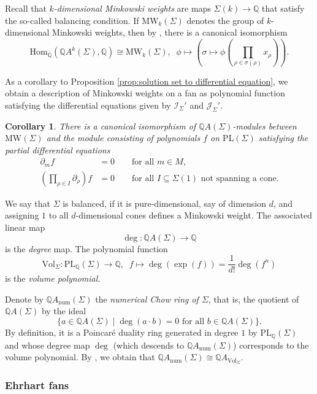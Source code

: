 \documentclass[oneside]{amsart}
\theoremstyle{plain}
\newtheorem{corollary}[theorem]{Corollary}
\theoremstyle{definition}
\newcommand{\Q}{{\mathbb{Q}}}
\newcommand{\Hom}{{\mathrm{Hom}}}
\newcommand{\Vol}{{\mathrm{Vol}}}
\newcommand{\PL}{{\mathrm{PL}}}
\newcommand{\mc}[1]{{\mathcal{#1}}}
\newcommand{\num}{{\mathrm{num}}}
\newcommand{\MW}{{\mathrm{MW}}}
\begin{document}
Recall that \emph{$k$-dimensional Minkowski weights} are maps $\Sigma(k)\to \Q$ that satisfy the so-called balancing condition. If $\MW_k(\Sigma)$ denotes the group of $k$-dimensional Minkowski weights, then by \cite[Theorem 1]{FMSSspherical}, there is a canonical isomorphism
\[
    \Hom_\Q(\Q A^k(\Sigma),\Q)\cong \MW_k(\Sigma),\;\; 
    \phi\mapsto \left(\sigma\mapsto \phi\left(\prod_{\rho\in \sigma(\rho)}x_\rho\right)\right).
\]


As a corollary to Proposition \ref{prop:solution set to differential equation}, we obtain a description of Minkowski weights on a fan as polynomial function satisfying the differential equations given by $\mc I_\Sigma'$ and $\mc J_\Sigma'$.

\begin{corollary}
\label{cor:solution set to differential equations}
There is a canonical isomorphism of $\Q A(\Sigma)$-modules between $\MW(\Sigma)$ and the module consisting of 
polynomials $f$ on $\PL(\Sigma)$ satisfying the partial differential equations
\begin{align*}
\partial_m f&=0  \qquad \text{for all }m\in M, \\
\left(\prod_{\rho\in I}\partial_\rho \right) f &= 0  \qquad \text{for all }I\subseteq \Sigma(1)\text{ not spanning a cone.}  
\end{align*}
\end{corollary}


We say that $\Sigma$ is balanced, if it is pure-dimensional, say of dimension $d$, and assigning $1$ to all $d$-dimensional cones defines a Minkowski weight. The associated linear map
\[
    \deg\colon \Q A(\Sigma) \to \Q
\]
is the \emph{degree} map. The polynomial function 
\[
    \Vol_\Sigma \colon \PL_\Q(\Sigma) \to \Q,\;\; f\mapsto \deg(\exp(f))= \frac{1}{d!}\deg(f^n)
\]
is the \emph{volume polynomial.} 

Denote by $\Q A_\num(\Sigma)$ the \emph{numerical Chow ring of $\Sigma$}, that is, the quotient of $\Q A(\Sigma)$ by the ideal 
\[
    \{a\in \Q A(\Sigma) \mid \deg(a\cdot b)=0 \text{ for all }b\in \Q A(\Sigma)\}.
\]
By definition, it is a Poincaré duality ring generated in degree $1$ by $\PL_\Q(\Sigma)$ and whose degree map $\deg$ (which descends to $\Q A_\num(\Sigma)$) corresponds to the volume polynomial. By , we obtain that $\Q A_\num(\Sigma)\cong \Q A_{\Vol_\Sigma}$.

\subsubsection{Ehrhart fans}
\end{document}
